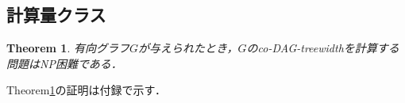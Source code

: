 \documentclass[master]{kuisthesis}		%
\theoremstyle{plain}
\newtheorem{theorem}{Theorem}
\newtheorem{lemma}{Lemma}
\theoremstyle{definition}
\newtheorem{definition*}{Definition}
\begin{document}
\subsection{計算量クラス}

\begin{theorem}\label{r-NP困難}
    有向グラフ$G$が与えられたとき，$G$のco-DAG-treewidthを計算する問題はNP困難である．
\end{theorem}

Theorem\ref{r-NP困難}の証明は付録で示す．

\end{document}

